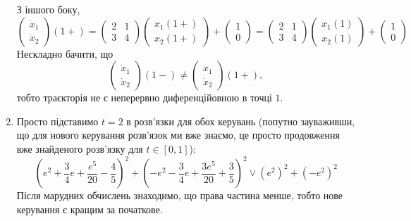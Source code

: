 \begin{solution}
\begin{enumerate}
		З іншого боку,
		\[
			\begin{pmatrix}
				\dot x_1 \\
				\dot x_2
			\end{pmatrix}
			(1+) 
			= 
			\begin{pmatrix}
				2 & 1 \\
				3 & 4
			\end{pmatrix}
			\begin{pmatrix}
				x_1(1+) \\
				x_2(1+)
			\end{pmatrix}
			+
			\begin{pmatrix}
				1 \\
				0
			\end{pmatrix}
			= 
			\begin{pmatrix}
				2 & 1 \\
				3 & 4
			\end{pmatrix}
			\begin{pmatrix}
				x_1(1) \\
				x_2(1)
			\end{pmatrix}
			+
			\begin{pmatrix}
				1 \\
				0
			\end{pmatrix}
		\]
		Нескладно бачити, що 
		\[
			\begin{pmatrix}
				\dot x_1 \\
				\dot x_2
			\end{pmatrix}
			(1-)
			\ne
			\begin{pmatrix}
				\dot x_1 \\
				\dot x_2
			\end{pmatrix}
			(1+),
		\]
		тобто траєкторія не є неперервно диференційовною в точці $1$.
		\item 
		Просто підставимо $t=2$ в розв'язки для обох керувань (попутно зауваживши, що для нового керування розв'язок ми вже знаємо, це просто продовження вже знайденого розв'язку для $t \in [0, 1]$):
		\[
			\left(e^2 + \dfrac34e + \dfrac{e^5}{20} - \dfrac45\right)^2 + \left(-e^2 - \dfrac34e + \dfrac{3e^5}{20} + \dfrac35\right)^2
			\lor
			(e^2)^2 + (-e^2)^2
		\]
		Після марудних обчислень знаходимо, що права частина менше, тобто нове керування є кращим за початкове.
	\end{enumerate}
\end{solution}

